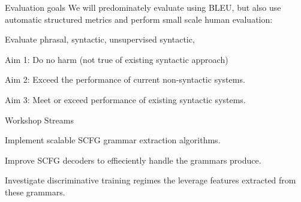 \documentclass{beamer}
\newenvironment{unpacked_itemize}{
\begin{itemize}
  \setlength{\itemsep}{10pt}
  \setlength{\parskip}{0pt}
  \setlength{\parsep}{0pt}
}{\end{itemize}}
\begin{document}
\begin{frame}[t]{Evaluation goals}
We will predominately evaluate using BLEU, but also use automatic structured metrics and perform small scale human evaluation:
\vspace{0.25in}
\begin{unpacked_itemize}
\item Evaluate phrasal, syntactic, unsupervised syntactic,
\item Aim 1: Do no harm (not true of existing syntactic approach)
\item Aim 2: Exceed the performance of current non-syntactic systems.
\item Aim 3: Meet or exceed performance of existing syntactic systems.
\end{unpacked_itemize}
\end{frame}



\begin{frame}[t]{Workshop Streams}
\vspace{0.25in}
\begin{unpacked_itemize}
\item Implement scalable SCFG grammar extraction algorithms.
\item Improve SCFG decoders to effieciently handle the grammars produce.
\item Investigate discriminative training regimes the leverage features extracted from these grammars.
\end{unpacked_itemize}
\end{frame}
\end{document}
